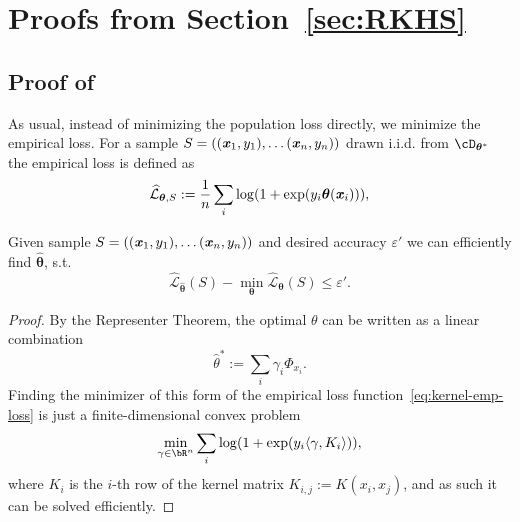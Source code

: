 \section{{Proofs from Section~\ref{sec:RKHS}}}
\subsection{Proof of~ \label{sec:kernel-logistic-regression-regret-bound}}
As usual, instead of minimizing the population loss directly, we minimize the empirical loss. For a sample $S = ((\boldsymbol{\mathit{x}}_1, y_1), \ldots (\boldsymbol{\mathit{x}}_n, y_n))$ drawn i.i.d. from $\cD_{\boldsymbol{\theta}^*}$ the empirical loss is defined as
\begin{equation*}
\widehat{\mathcal{L}}_{\boldsymbol{\theta}, S} := \frac{1}{n}\sum_i \log(1 + \exp(y_i \boldsymbol{\theta}(\boldsymbol{\mathit{x}}_i))),
\end{equation*}

\begin{lemma}
\label{lem:kernel-log-regression-easy}

Given sample $S = ((\boldsymbol{\mathit{x}}_1, y_1), \ldots (\boldsymbol{\mathit{x}}_n, y_n))$ and desired accuracy $\varepsilon'$ we can efficiently  find  $\hat{\boldsymbol{\theta}}$, s.t.
\begin{equation*}
\label{lem:rkhs-optimization-easy}
    \widehat{\mathcal{L}}_{\hat{\boldsymbol{\theta}}}(S) - \min_{\boldsymbol{\theta}} \widehat{\mathcal{L}}_{\boldsymbol{\theta}}(S) \leq \varepsilon'.
\end{equation*}
\end{lemma}
\begin{proof}
By the Representer Theorem, the optimal $\theta$ can be written as a linear combination
\begin{equation}
\label{eq:kernel-emp-loss}
    \hat{\theta}^* := \sum_i \gamma_i \Phi_{x_i}.
\end{equation}
Finding the minimizer of this form of the empirical loss function~\eqref{eq:kernel-emp-loss} is just a finite-dimensional convex problem
\begin{equation*}
    \min_{\gamma \in \bR^n} \sum_i \log(1 + \exp(y_i \langle \gamma, K_{i} \rangle)),
\end{equation*}
where $K_{i}$ is the $i$-th row of the kernel matrix  $K_{i,j} := K(x_i, x_j)$, and as such it can be solved efficiently.
\end{proof}


